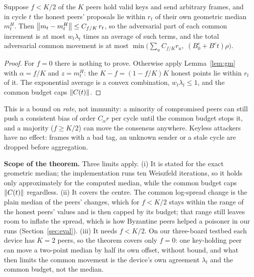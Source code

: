 \begin{theorem}\label{thm:byz}
Suppose $f<K/2$ of the $K$ peers hold valid keys and send arbitrary frames, and in cycle $t$ the honest
peers' proposals lie within $r_t$ of their own geometric median $m_t^H$. Then
$\left\lVert m_t-m_t^H \right\rVert\le C_{f/K}\,r_t$, so the adversarial part of each common increment is at most
$w_t\lambda_t$ times an average of such terms, and the total adversarial common movement is at most
$\min\big(\sum_u C_{f/K} r_u,\;(B_0^c+B^c t)\rho\big)$.
\end{theorem}
\begin{proof}
For $f=0$ there is nothing to prove. Otherwise apply Lemma~\ref{lem:gm} with $\alpha=f/K$ and
$z=m_t^H$: the $K-f=(1-f/K)K$ honest points lie within $r_t$ of it. The exponential
average is a convex combination, $w_t\lambda_t\le1$, and the common budget caps $\left\lVert C(t) \right\rVert$.
\end{proof}
This is a bound on \emph{rate}, not immunity: a minority of compromised peers can still push a
consistent bias of order $C_\alpha r$ per cycle until the common budget stops it, and a majority
($f\ge K/2$) can move the consensus anywhere. Keyless attackers have no effect: frames with a bad tag,
an unknown sender or a stale cycle are dropped before aggregation.

\textbf{Scope of the theorem.} Three limits apply. (i) It is stated for the exact geometric median; the
implementation runs ten Weiszfeld iterations, so it holds only approximately for the computed median,
while the common budget caps $\left\lVert C(t) \right\rVert$ regardless. (ii) It covers the centre. The common log-spread
change is the plain median of the peers' changes, which for $f<K/2$ stays within the range of the honest
peers' values and is then capped by its budget; that range still leaves room to inflate the spread,
which is how Byzantine peers helped a poisoner in our runs (Section~\ref{sec:eval}). (iii) It needs
$f<K/2$. On our three-board testbed each device has $K=2$ peers, so the theorem covers only $f=0$: one
key-holding peer can move a two-point median by half its own offset, without bound, and what then limits
the common movement is the device's own agreement $\lambda_t$ and the common budget, not the median.

